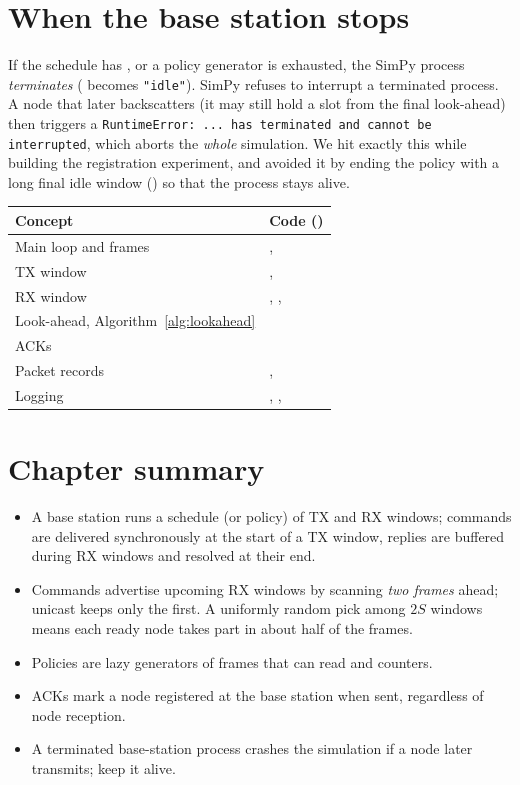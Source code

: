 \section{When the base station stops}
\label{sec:terminate}

If the schedule has , or a policy generator is exhausted, the SimPy process \emph{terminates} ( becomes \texttt{"idle"}). SimPy refuses to interrupt a terminated process. A node that later backscatters (it may still hold a slot from the final look-ahead) then triggers a \texttt{RuntimeError: ... has terminated and cannot be interrupted}, which aborts the \emph{whole} simulation. We hit exactly this while building the registration experiment, and avoided it by ending the policy with a long final idle window (\codew{[("rx", 10_000, "tail")]}) so that the process stays alive.

\begin{codemap}
\small
\begin{tabularx}{\linewidth}{@{}>{\ttfamily}p{5.0cm}X@{}}
\toprule
\normalfont\bfseries Concept & \normalfont\bfseries Code (\file{bsengine.py})\\
\midrule
Main loop and frames & \codew{BSBehavior.run}, \code{_run_policy}\\
TX window & \code{_do_tx}, \codew{_deliver_command}\\
RX window & \code{_do_rx}, \code{_buffer_rx}, \codew{_process_rx_buffer}\\
Look-ahead, Algorithm~\ref{alg:lookahead} & \codew{_get_next_rx_slots}\\
ACKs & \codew{_send_pending_acks}\\
Packet records & \code{RxPacket}, \code{TxPacket}\\
Logging & \code{save_logs}, \codew{close_stream}, \code{stream_log}\\
\bottomrule
\end{tabularx}
\end{codemap}

\section{Chapter summary}
\begin{itemize}
 \item A base station runs a schedule (or policy) of TX and RX windows; commands are delivered synchronously at the start of a TX window, replies are buffered during RX windows and resolved at their end.
 \item Commands advertise upcoming RX windows by scanning \emph{two frames} ahead; unicast keeps only the first. A uniformly random pick among $2S$ windows means each ready node takes part in about half of the frames.
 \item Policies are lazy generators of frames that can read  and counters.
 \item ACKs mark a node registered at the base station when sent, regardless of node reception.
 \item A terminated base-station process crashes the simulation if a node later transmits; keep it alive.
\end{itemize}

